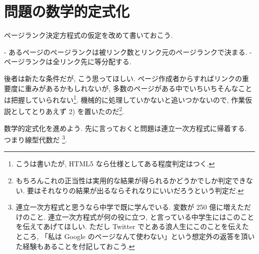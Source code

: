 \documentclass[openany, a4paper, oneside]{jsbook}
\begin{document}
\section{問題の数学的定式化}

ページランク決定方程式の仮定を改めて書いておこう.
\begin{assump}
- あるページのページランクは被リンク数とリンク元のページランクで決まる.
- ページランクは全リンク先に等分配する.
\end{assump}
後者は新たな条件だが, こう思ってほしい.
ページ作成者からすればリンクの重要度に重みがあるかもしれないが,
多数のページがある中でいちいちそんなことは把握していられない\footnote{こうは書いたが, HTML5 なら仕様としてある程度判定はつく.}.
機械的に処理していかないと追いつかないので, 作業仮説としてとりあえず 2) を置いたのだ\footnote{もちろんこれの正当性は実用的な結果が得られるかどうかでしか判定できない.
要はそれなりの結果が出るならそれなりにいいだろうという判定だ.}.

数学的定式化を進めよう.
先に言っておくと問題は連立一次方程式に帰着する.
つまり線型代数だ \footnote{連立一次方程式と思うなら中学で既に学んでいる.
変数が 250 億に増えただけのこと.
連立一次方程式が何の役に立つ, と言っている中学生にはこのことを伝えてあげてほしい.
ただし Twitter でとある浪人生にこのことを伝えたところ,
「私は Google のページなんて使わない」という想定外の返答を頂いた経験もあることを付記しておこう.}.
\end{document}
